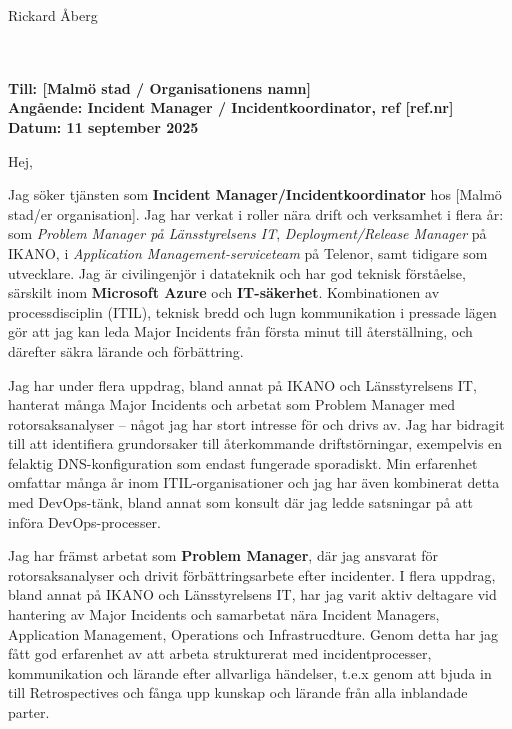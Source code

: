 \documentclass[11pt,a4paper]{article}
\begin{document}
\begin{flushright}
Rickard Åberg\\
[Malmö]\\
[rickard.mail@exempel.se] \quad [070-xxx xx xx]\\
\end{flushright}

\vspace{1em}

\noindent \textbf{Till: [Malmö stad / Organisationens namn]}\\
\textbf{Angående: Incident Manager / Incidentkoordinator, ref [ref.nr]}\\
\textbf{Datum: 11 september 2025}

\vspace{1em}

Hej,

Jag söker tjänsten som \textbf{Incident Manager/Incidentkoordinator} hos [Malmö stad/er organisation]. Jag har verkat i roller nära drift och verksamhet i flera år: som \textit{Problem Manager på Länsstyrelsens IT}, \textit{Deployment/Release Manager} på IKANO, i \textit{Application Management-serviceteam} på Telenor, samt tidigare som utvecklare. Jag är civilingenjör i datateknik och har god teknisk förståelse, särskilt inom \textbf{Microsoft Azure} och \textbf{IT-säkerhet}. Kombinationen av processdisciplin (ITIL), teknisk bredd och lugn kommunikation i pressade lägen gör att jag kan leda Major Incidents från första minut till återställning, och därefter säkra lärande och förbättring.

Jag har under flera uppdrag, bland annat på IKANO och Länsstyrelsens IT, hanterat många Major Incidents och arbetat som Problem Manager med rotorsaksanalyser – något jag har stort intresse för och drivs av. Jag har bidragit till att identifiera grundorsaker till återkommande driftstörningar, exempelvis en felaktig DNS-konfiguration som endast fungerade sporadiskt. Min erfarenhet omfattar många år inom ITIL-organisationer och jag har även kombinerat detta med DevOps-tänk, bland annat som konsult där jag ledde satsningar på att införa DevOps-processer.

Jag har främst arbetat som \textbf{Problem Manager}, där jag ansvarat för rotorsaksanalyser och drivit förbättringsarbete efter incidenter. I flera uppdrag, bland annat på IKANO och Länsstyrelsens IT, har jag varit aktiv deltagare vid hantering av Major Incidents och samarbetat nära Incident Managers, Application Management, Operations och Infrastrucdture. Genom detta har jag fått god erfarenhet av att arbeta strukturerat med incidentprocesser, kommunikation och lärande efter allvarliga händelser, t.e.x genom att bjuda in till Retrospectives och fånga upp kunskap och lärande från alla inblandade parter.
\end{document}
